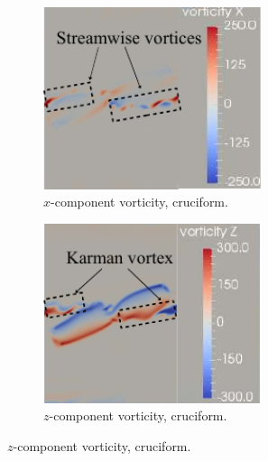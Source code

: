 \documentclass[oneside]{utmthesis}
\begin{document}
\begin{figure}
  \centering
  \begin{subfigure}[h]{0.4\textwidth}
    \centering
    \includegraphics[width=0.7\textwidth]{figs/vorx225}
    \caption{$x$-component vorticity, \angfo{} cruciform.}
    \label{fig:vorx225}
  \end{subfigure}
  \begin{subfigure}[h]{0.4\textwidth}
    \centering
    \includegraphics[width=0.7\textwidth]{figs/vorz225}
    \caption{$z$-component vorticity, \angfo{} cruciform.}
    \label{fig:vorz225}
  \end{subfigure}


\end{figure}
\end{document}
